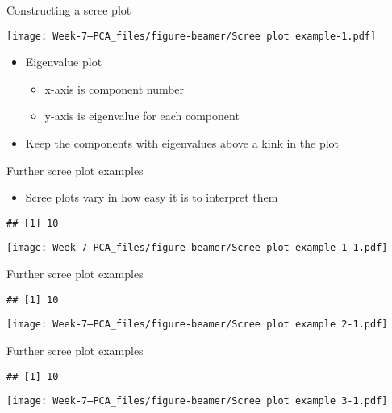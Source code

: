 \documentclass[
  ignorenonframetext,
]{beamer}
\providecommand{\tightlist}{%
  \setlength{\itemsep}{0pt}\setlength{\parskip}{0pt}}
\begin{document}
\begin{frame}{Constructing a scree plot}
\protect\hypertarget{constructing-a-scree-plot}{}

\texttt{[image: Week-7---PCA\_files/figure-beamer/Scree plot example-1.pdf]}

\begin{itemize}
\tightlist
\item
  Eigenvalue plot

  \begin{itemize}
  \tightlist
  \item
    x-axis is component number
  \item
    y-axis is eigenvalue for each component
  \end{itemize}
\item
  Keep the components with eigenvalues above a kink in the plot
\end{itemize}

\end{frame}

\begin{frame}[fragile]{Further scree plot examples}
\protect\hypertarget{further-scree-plot-examples}{}

\begin{itemize}
\tightlist
\item
  Scree plots vary in how easy it is to interpret them
\end{itemize}

\begin{verbatim}
## [1] 10
\end{verbatim}

\texttt{[image: Week-7---PCA\_files/figure-beamer/Scree plot example 1-1.pdf]}

\end{frame}

\begin{frame}[fragile]{Further scree plot examples}
\protect\hypertarget{further-scree-plot-examples-1}{}

\begin{verbatim}
## [1] 10
\end{verbatim}

\texttt{[image: Week-7---PCA\_files/figure-beamer/Scree plot example 2-1.pdf]}

\end{frame}

\begin{frame}[fragile]{Further scree plot examples}
\protect\hypertarget{further-scree-plot-examples-2}{}

\begin{verbatim}
## [1] 10
\end{verbatim}

\texttt{[image: Week-7---PCA\_files/figure-beamer/Scree plot example 3-1.pdf]}

\end{frame}
\end{document}
